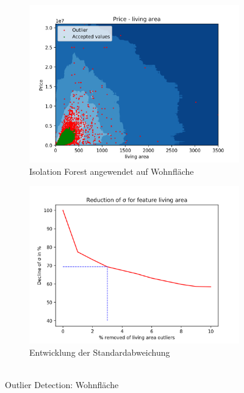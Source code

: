 \begin{figure}[ht]
\begin{subfigure}{.5\textwidth}
  \centering
  \includegraphics[width=\linewidth]{images/living_area_IsolationForest.png}
  \caption[Isolation Forest angewendet auf Wohnfläche]{Isolation Forest angewendet auf Wohnfläche}
  \label{fig:isolation_forest}
\end{subfigure}
\begin{subfigure}{.5\textwidth}
  \centering
  \includegraphics[width=\linewidth]{images/living_area_std.png}
  \caption[Entwicklung der Standardabweichung]{Entwicklung der Standardabweichung\\ \ } %
  \label{fig:isolation_std}
\end{subfigure}
\caption[Outlier Detection: Wohnfläche]{Outlier Detection: Wohnfläche}
\label{fig:outlier}
\end{figure}

